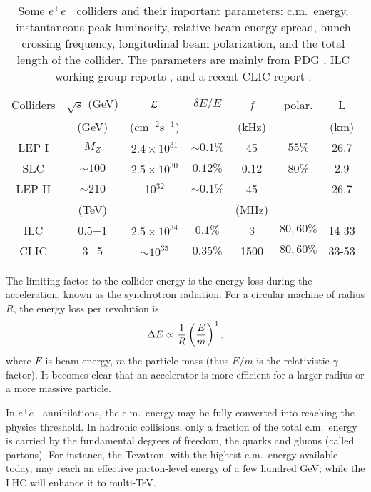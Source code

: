 \documentclass[prd,aps,floats,preprintnumbers,preprint,superscriptaddress,floatfix,nofootinbib]{revtex4}
\def\epem{e^+e^-}
\def\bea{\begin{eqnarray}}
\def\eea{\end{eqnarray}}
\begin{document}
\begin{table}[tb]
    \begin{tabular}[t]{|c| c | c | c |c|c|c|}
       \hline
        Colliders  & $\sqrt s$ (GeV) & ${\cal{L}}$ & $\delta E/E$ & $f$& 
        polar. & L \\
 &(GeV) & (cm$^{-2}$s$^{-1}$)& & (kHz) & &(km) \\
        \hline        \hline
        LEP I   & $M_Z$ & $2.4\times10^{31}$  &  $\sim 0.1\%$   &  45   & $55\%$ & 26.7\\
        SLC    & $ \sim 100 $             & $2.5\times 10^{30}$  &  $0.12\%$ & 0.12 &  80\% & 2.9\\
        LEP II  & $\sim 210$ &  10$^{32}$   & $\sim 0.1\%$ & 45 & & 26.7 \\
\hline\hline
 &(TeV) & & & (MHz) & & \\
        ILC    & 0.5$-$1  & $2.5\times 10^{34}$ & $0.1\%$ &  3 & $80,60\%$ & 14-33\\
\hline
                CLIC    & 3$-$5  & $\sim 10^{35}$ & $0.35\%$ & 1500 & $80,60\%$ & 33-53\\
\hline
    \end{tabular}
\caption{Some $e^+e^-$ colliders and their important parameters:
c.m.~energy, instantaneous peak luminosity, relative beam energy spread, 
bunch crossing frequency, longitudinal beam 
polarization, and the total length of the collider. The parameters are mainly from
PDG {\protect \cite{PDG}}, 
ILC working group reports {\protect \cite{ILC}}, 
 and a recent CLIC report  {\protect \cite{CLIC}}.
}
\label{eecolliders} 
\end{table}

The limiting factor to the collider energy is the energy loss 
during the acceleration, known as the synchrotron radiation.
For a circular machine of radius $R$, the energy loss per revolution
is \cite{PDG,book-exp}
\bea
\label{synch}
\Delta E \propto {1\over R} \left({E\over m}\right)^4,
\eea
where $E$ is beam energy, $m$ the particle mass (thus $E/m$ is the
relativistic $\gamma$ factor). It becomes clear that an accelerator is more
efficient for a larger radius or a more massive particle.

In $\epem$ annihilations, the c.m.~energy may be fully converted into reaching the 
physics threshold. In hadronic collisions, only a fraction of the total c.m.~energy
is carried by the fundamental degrees of freedom, the quarks and gluons (called partons).
For instance, the Tevatron, with the highest c.m.~energy
available today, may reach an effective parton-level energy of a few hundred GeV;
while the LHC will enhance it to multi-TeV.
\end{document}
